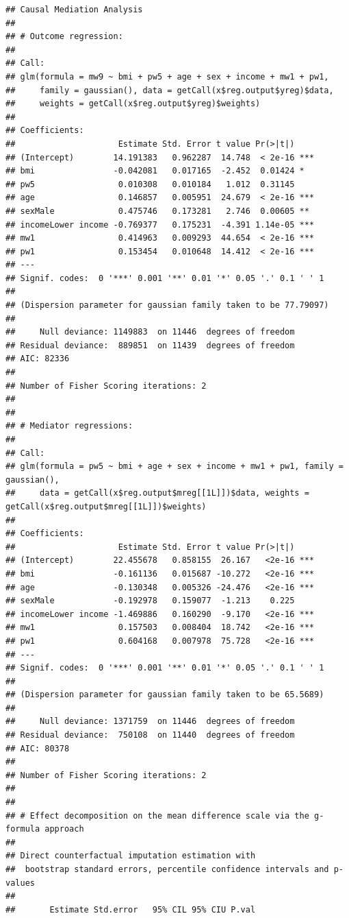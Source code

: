 \documentclass[
]{book}
\begin{document}
\begin{verbatim}
## Causal Mediation Analysis
## 
## # Outcome regression:
## 
## Call:
## glm(formula = mw9 ~ bmi + pw5 + age + sex + income + mw1 + pw1, 
##     family = gaussian(), data = getCall(x$reg.output$yreg)$data, 
##     weights = getCall(x$reg.output$yreg)$weights)
## 
## Coefficients:
##                     Estimate Std. Error t value Pr(>|t|)    
## (Intercept)        14.191383   0.962287  14.748  < 2e-16 ***
## bmi                -0.042081   0.017165  -2.452  0.01424 *  
## pw5                 0.010308   0.010184   1.012  0.31145    
## age                 0.146857   0.005951  24.679  < 2e-16 ***
## sexMale             0.475746   0.173281   2.746  0.00605 ** 
## incomeLower income -0.769377   0.175231  -4.391 1.14e-05 ***
## mw1                 0.414963   0.009293  44.654  < 2e-16 ***
## pw1                 0.153454   0.010648  14.412  < 2e-16 ***
## ---
## Signif. codes:  0 '***' 0.001 '**' 0.01 '*' 0.05 '.' 0.1 ' ' 1
## 
## (Dispersion parameter for gaussian family taken to be 77.79097)
## 
##     Null deviance: 1149883  on 11446  degrees of freedom
## Residual deviance:  889851  on 11439  degrees of freedom
## AIC: 82336
## 
## Number of Fisher Scoring iterations: 2
## 
## 
## # Mediator regressions: 
## 
## Call:
## glm(formula = pw5 ~ bmi + age + sex + income + mw1 + pw1, family = gaussian(), 
##     data = getCall(x$reg.output$mreg[[1L]])$data, weights = getCall(x$reg.output$mreg[[1L]])$weights)
## 
## Coefficients:
##                     Estimate Std. Error t value Pr(>|t|)    
## (Intercept)        22.455678   0.858155  26.167   <2e-16 ***
## bmi                -0.161136   0.015687 -10.272   <2e-16 ***
## age                -0.130348   0.005326 -24.476   <2e-16 ***
## sexMale            -0.192978   0.159077  -1.213    0.225    
## incomeLower income -1.469886   0.160290  -9.170   <2e-16 ***
## mw1                 0.157503   0.008404  18.742   <2e-16 ***
## pw1                 0.604168   0.007978  75.728   <2e-16 ***
## ---
## Signif. codes:  0 '***' 0.001 '**' 0.01 '*' 0.05 '.' 0.1 ' ' 1
## 
## (Dispersion parameter for gaussian family taken to be 65.5689)
## 
##     Null deviance: 1371759  on 11446  degrees of freedom
## Residual deviance:  750108  on 11440  degrees of freedom
## AIC: 80378
## 
## Number of Fisher Scoring iterations: 2
## 
## 
## # Effect decomposition on the mean difference scale via the g-formula approach
##  
## Direct counterfactual imputation estimation with 
##  bootstrap standard errors, percentile confidence intervals and p-values 
##  
##       Estimate Std.error   95% CIL 95% CIU P.val  

\end{verbatim}
\end{document}
